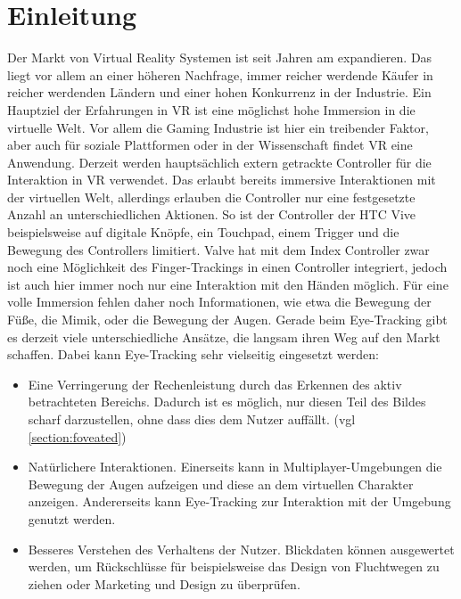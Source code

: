 \chapter{Einleitung}
Der Markt von Virtual Reality Systemen ist seit Jahren am expandieren. Das liegt vor allem an einer höheren Nachfrage, immer reicher werdende Käufer in reicher werdenden Ländern und einer hohen Konkurrenz in der Industrie\cite{grandview.2020}. Ein Hauptziel der Erfahrungen in \ac{VR} ist eine möglichst hohe Immersion in die virtuelle Welt. Vor allem die Gaming Industrie ist hier ein treibender Faktor, aber auch für soziale Plattformen oder in der Wissenschaft findet \ac{VR} eine Anwendung. Derzeit werden hauptsächlich extern getrackte Controller für die Interaktion in \ac{VR} verwendet. Das erlaubt bereits immersive Interaktionen mit der virtuellen Welt, allerdings erlauben die Controller nur eine festgesetzte Anzahl an unterschiedlichen Aktionen. So ist der Controller der HTC Vive beispielsweise auf digitale Knöpfe, ein Touchpad, einem Trigger und die Bewegung des Controllers limitiert. Valve hat mit dem Index Controller zwar noch eine Möglichkeit des Finger-Trackings in einen Controller integriert, jedoch ist auch hier immer noch nur eine Interaktion mit den Händen möglich. Für eine volle Immersion fehlen daher noch Informationen, wie etwa die Bewegung der Füße, die Mimik, oder die Bewegung der Augen. Gerade beim Eye-Tracking gibt es derzeit viele unterschiedliche Ansätze, die langsam ihren Weg auf den Markt schaffen. Dabei kann Eye-Tracking sehr vielseitig eingesetzt werden:
\begin{itemize}
	\item Eine Verringerung der Rechenleistung durch das Erkennen des aktiv betrachteten Bereichs. Dadurch ist es möglich, nur diesen Teil des Bildes scharf darzustellen, ohne dass dies dem Nutzer auffällt.\cite{Rogers.2019} (vgl \autoref{section:foveated})
	\item Natürlichere Interaktionen. Einerseits kann in Multiplayer-Umgebungen die Bewegung der Augen aufzeigen und diese an dem virtuellen Charakter anzeigen. Andererseits kann Eye-Tracking zur Interaktion mit der Umgebung genutzt werden.\cite{Rogers.2019} 
	\item Besseres Verstehen des Verhaltens der Nutzer. Blickdaten können ausgewertet werden, um Rückschlüsse für beispielsweise das Design von Fluchtwegen zu ziehen oder Marketing und Design zu überprüfen.\cite{Rogers.2019}
\end{itemize}
